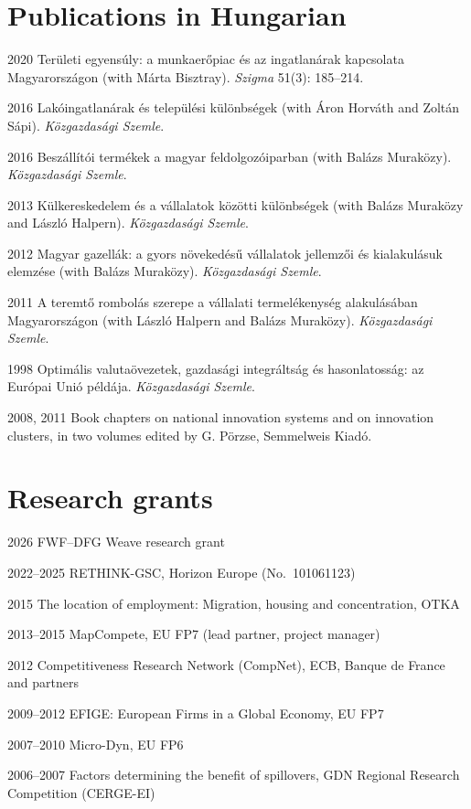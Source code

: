 \documentclass[10pt,a4paper]{article}
\newcommand{\jn}[1]{\textit{#1}}
\begin{document}
\section{Publications in Hungarian}
\begin{cvlist}
  \item[2020] Területi egyensúly: a munkaerőpiac és az ingatlanárak kapcsolata Magyarországon (with Márta Bisztray). \jn{Szigma} 51(3): 185--214.
  \item[2016] Lakóingatlanárak és települési különbségek (with Áron Horváth and Zoltán Sápi). \jn{Közgazdasági Szemle}.
  \item[2016] Beszállítói termékek a magyar feldolgozóiparban (with Balázs Muraközy). \jn{Közgazdasági Szemle}.
  \item[2013] Külkereskedelem és a vállalatok közötti különbségek (with Balázs Muraközy and László Halpern). \jn{Közgazdasági Szemle}.
  \item[2012] Magyar gazellák: a gyors növekedésű vállalatok jellemzői és kialakulásuk elemzése (with Balázs Muraközy). \jn{Közgazdasági Szemle}.
  \item[2011] A teremtő rombolás szerepe a vállalati termelékenység alakulásában Magyarországon (with László Halpern and Balázs Muraközy). \jn{Közgazdasági Szemle}.
  \item[1998] Optimális valutaövezetek, gazdasági integráltság és hasonlatosság: az Európai Unió példája. \jn{Közgazdasági Szemle}.
  \item[2008, 2011] Book chapters on national innovation systems and on innovation clusters, in two volumes edited by G. Pörzse, Semmelweis Kiadó.
\end{cvlist}

\section{Research grants}
\begin{cvlist}
  \item[2026] FWF--DFG Weave research grant
  \item[2022--2025] RETHINK-GSC, Horizon Europe (No.\ 101061123)
  \item[2015] The location of employment: Migration, housing and concentration, OTKA
  \item[2013--2015] MapCompete, EU FP7 (lead partner, project manager)
  \item[2012] Competitiveness Research Network (CompNet), ECB, Banque de France and partners
  \item[2009--2012] EFIGE: European Firms in a Global Economy, EU FP7
  \item[2007--2010] Micro-Dyn, EU FP6
  \item[2006--2007] Factors determining the benefit of spillovers, GDN Regional Research Competition (CERGE-EI)
\end{cvlist}
\end{document}
